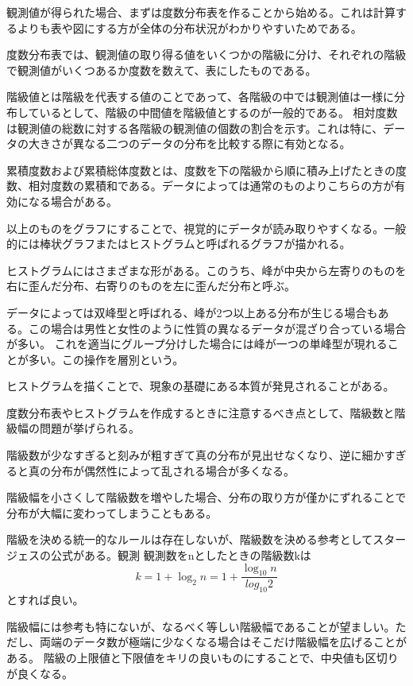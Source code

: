 \documentclass[a4paper,11pt]{jsarticle}
\begin{document}
観測値が得られた場合、まずは度数分布表を作ることから始める。これは計算するよりも表や図にする方が全体の分布状況がわかりやすいためである。

度数分布表では、観測値の取り得る値をいくつかの階級に分け、それぞれの階級で観測値がいくつあるか度数を数えて、表にしたものである。

階級値とは階級を代表する値のことであって、各階級の中では観測値は一様に分布しているとして、階級の中間値を階級値とするのが一般的である。
相対度数は観測値の総数に対する各階級の観測値の個数の割合を示す。これは特に、データの大きさが異なる二つのデータの分布を比較する際に有効となる。

累積度数および累積総体度数とは、度数を下の階級から順に積み上げたときの度数、相対度数の累積和である。データによっては通常のものよりこちらの方が有効になる場合がある。

以上のものをグラフにすることで、視覚的にデータが読み取りやすくなる。一般的には棒状グラフまたはヒストグラムと呼ばれるグラフが描かれる。

ヒストグラムにはさまざまな形がある。このうち、峰が中央から左寄りのものを右に歪んだ分布、右寄りのものを左に歪んだ分布と呼ぶ。

データによっては双峰型と呼ばれる、峰が2つ以上ある分布が生じる場合もある。この場合は男性と女性のように性質の異なるデータが混ざり合っている場合が多い。
これを適当にグループ分けした場合には峰が一つの単峰型が現れることが多い。この操作を層別という。

ヒストグラムを描くことで、現象の基礎にある本質が発見されることがある。

度数分布表やヒストグラムを作成するときに注意するべき点として、階級数と階級幅の問題が挙げられる。

階級数が少なすぎると刻みが粗すぎて真の分布が見出せなくなり、逆に細かすぎると真の分布が偶然性によって乱される場合が多くなる。

階級幅を小さくして階級数を増やした場合、分布の取り方が僅かにずれることで分布が大幅に変わってしまうこともある。

階級を決める統一的なルールは存在しないが、階級数を決める参考としてスタージェスの公式がある。観測
観測数をnとしたときの階級数kは
\begin{equation}
  k = 1 + \log_2{n} = 1 + \frac{\log_{10}n}{log_{10}2}
\end{equation}
とすれば良い。

階級幅には参考も特にないが、なるべく等しい階級幅であることが望ましい。ただし、両端のデータ数が極端に少なくなる場合はそこだけ階級幅を広げることがある。
階級の上限値と下限値をキリの良いものにすることで、中央値も区切りが良くなる。
\end{document}
